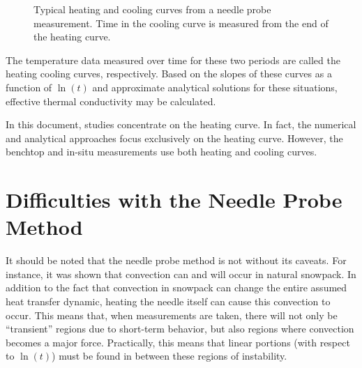 \begin{figure}[h]
\centering
{}
\caption{Typical heating and cooling curves from a needle probe measurement.
Time in the cooling curve is measured from the end of the heating curve.}
\end{figure}

The temperature data measured over time for these two periods are called the
heating cooling curves, respectively.  Based on the slopes of these
curves as a function of \(\ln(t)\) and approximate analytical solutions for
these situations, effective thermal conductivity may be calculated.

In this document, studies concentrate on the heating curve. In fact, the
numerical and analytical approaches focus exclusively on the heating curve. However, the
benchtop and in-situ measurements use both heating and cooling curves.

\section{Difficulties with the Needle Probe Method}

It should be noted that the needle probe method is not without its caveats. For
instance, it was shown that convection can and will occur in natural snowpack.
\cite{sturm3} In addition to the fact that convection in snowpack can change the
entire assumed heat transfer dynamic, heating the needle itself can cause this
convection to occur. This means that, when measurements are taken, there will
not only be ``transient'' regions due to short-term behavior, but also regions
where convection becomes a major force. Practically, this means that linear
portions (with respect to \(\ln(t)\)) must be found in between these regions
of instability.

